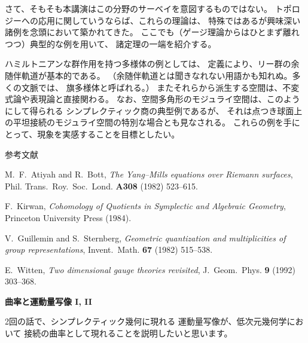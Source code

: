 \documentclass[uplatex,dvipdfmx]{jlreq}
\begin{document}
さて、そもそも本講演はこの分野のサーベイを意図するものではない。
トポロジーへの応用に関していうならば、これらの理論は、
特殊ではあるが興味深い諸例を念頭において築かれてきた。
ここでも（ゲージ理論からはひとまず離れつつ）典型的な例を用いて、
諸定理の一端を紹介する。

ハミルトニアンな群作用を持つ多様体の例としては、
定義により、リー群の余随伴軌道が基本的である。
（余随伴軌道とは聞きなれない用語かも知れぬ。多くの文脈では、
旗多様体と呼ばれる。）
またそれらから派生する空間は、不変式論や表現論と直接関わる。
なお、空間多角形のモジュライ空間は、このようにして得られる
シンプレクティック商の典型例であるが、
それは点つき球面上の平坦接続のモジュライ空間の特別な場合とも見なされる。
これらの例を手にとって、現象を実感することを目標としたい。
\vspace{1pc}

\begin{center}\textsc{参考文献}\end{center}
\begin{enumerate}[{[1]}]
\item
M.~F.~Atiyah and R.~Bott, \textit{The Yang--Mills equations over Riemann
surfaces}, Phil. Trans.~Roy.~Soc.~Lond. \textbf{A308} (1982) 523--615.
\item
F.~Kirwan, \textit{Cohomology of Quotients in Symplectic and Algebraic Geometry}, Princeton University Press (1984).
\item
V.~Guillemin and S.~Sternberg,
\textit{Geometric quantization and multiplicities of group representations},
Invent.~Math. \textbf{67} (1982) 515--538.
\item
E.~Witten, \textit{Two dimensional gauge theories revisited},
J.~Geom.~Phys. \textbf{9} (1992) 303--368.
\end{enumerate}

\newpage

\begin{center}
{\large\bfseries 曲率と運動量写像 I, II}\\[6pt]
\hspace*{\fill}{\large\bfseries 古田　幹雄（東大・数理）}
\end{center}
\vspace{1pc}

2回の話で、シンプレクティック幾何に現れる
運動量写像が、低次元幾何学において
接続の曲率として現れることを説明したいと思います。
\end{document}
